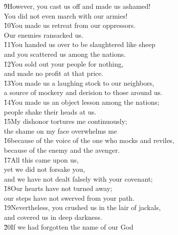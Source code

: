 \begin{poetry}
\poeml \v{9}However, you cast us off and made us ashamed! \\
\poemll    You did not even march with our armies! \\
\poeml \v{10}You made us retreat from our oppressors. \\
\poemll    Our enemies ransacked us. \\
\poeml \v{11}You handed us over to be slaughtered like sheep \\
\poemll    and you scattered us among the nations. \\
\poeml \v{12}You sold out your people for nothing, \\
\poemll    and made no profit at that price. \\
\poeml \v{13}You made us a laughing stock to our neighbors, \\
\poemll    a source of mockery and derision to those around us. \\
\poeml \v{14}You made us an object lesson among the nations; \\
\poemll    people shake their heads at us. \\
\poeml \v{15}My dishonor tortures me continuously; \\
\poemll    the shame on my face overwhelms me \\
\poeml \v{16}because of the voice of the one who mocks and reviles, \\
\poemll    because of the enemy and the avenger. \\
\poeml \v{17}All this came upon us, \\
\poemll    yet we did not forsake you, \\
\poemlll       and we have not dealt falsely with your covenant; \\
\poeml \v{18}Our hearts have not turned away; \\
\poemll    our steps have not swerved from your path. \\
\poeml \v{19}Nevertheless, you crushed us in the lair of jackals, \\
\poemll    and covered us in deep darkness. \\
\poeml \v{20}If we had forgotten the name of our God \\

\end{poetry}
